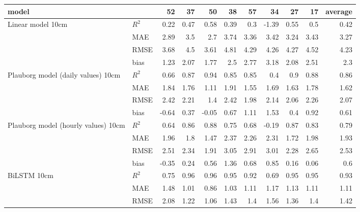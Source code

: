 \begin{tabular}{llrrrrrrrrr}
\hline
 model                               &       &    52 &    37 &    50 &   38 &   57 &    34 &    27 &   17 &   average \\
\hline
 Linear model 10cm                   & $R^2$ &  0.22 &  0.47 &  0.58 & 0.39 & 0.3  & -1.39 &  0.55 & 0.5  &      0.42 \\
                                     & MAE   &  2.89 &  3.5  &  2.7  & 3.74 & 3.36 &  3.42 &  3.24 & 3.43 &      3.27 \\
                                     & RMSE  &  3.68 &  4.5  &  3.61 & 4.81 & 4.29 &  4.26 &  4.27 & 4.52 &      4.23 \\
                                     & bias  &  1.23 &  2.07 &  1.77 & 2.5  & 2.77 &  3.18 &  2.08 & 2.51 &      2.3  \\
 Plauborg model (daily values) 10cm  & $R^2$ &  0.66 &  0.87 &  0.94 & 0.85 & 0.85 &  0.4  &  0.9  & 0.88 &      0.86 \\
                                     & MAE   &  1.84 &  1.76 &  1.11 & 1.91 & 1.55 &  1.69 &  1.63 & 1.78 &      1.62 \\
                                     & RMSE  &  2.42 &  2.21 &  1.4  & 2.42 & 1.98 &  2.14 &  2.06 & 2.26 &      2.07 \\
                                     & bias  & -0.64 &  0.37 & -0.05 & 0.67 & 1.11 &  1.53 &  0.4  & 0.92 &      0.61 \\
 Plauborg model (hourly values) 10cm & $R^2$ &  0.64 &  0.86 &  0.88 & 0.75 & 0.68 & -0.19 &  0.87 & 0.83 &      0.79 \\
                                     & MAE   &  1.96 &  1.8  &  1.47 & 2.37 & 2.26 &  2.31 &  1.72 & 1.98 &      1.93 \\
                                     & RMSE  &  2.51 &  2.34 &  1.91 & 3.05 & 2.91 &  3.01 &  2.28 & 2.65 &      2.53 \\
                                     & bias  & -0.35 &  0.24 &  0.56 & 1.36 & 0.68 &  0.85 &  0.16 & 0.06 &      0.6  \\
 BiLSTM 10cm                         & $R^2$ &  0.75 &  0.96 &  0.96 & 0.95 & 0.92 &  0.69 &  0.95 & 0.95 &      0.93 \\
                                     & MAE   &  1.48 &  1.01 &  0.86 & 1.03 & 1.11 &  1.17 &  1.13 & 1.11 &      1.11 \\
                                     & RMSE  &  2.08 &  1.22 &  1.06 & 1.43 & 1.4  &  1.56 &  1.36 & 1.4  &      1.42 \\

\end{tabular}
